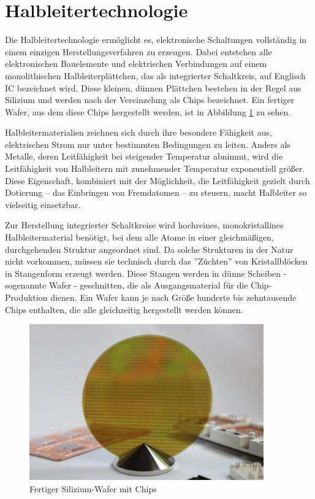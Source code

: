 \section{Halbleitertechnologie}

Die Halbleitertechnologie ermöglicht es, elektronische Schaltungen vollständig in einem einzigen Herstellungsverfahren zu erzeugen. Dabei entstehen alle elektronischen Bauelemente und elektrischen Verbindungen auf einem monolithischen Halbleiterplättchen, das als integrierter Schaltkreis, auf Englisch \gls{IC} bezeichnet wird. Diese kleinen, dünnen Plättchen bestehen in der Regel aus Silizium und werden nach der Vereinzelung als Chips bezeichnet. Ein fertiger Wafer, aus dem diese Chips hergestellt werden, ist in Abbildung \ref{fig:Silizium-Wafer} zu sehen.

Halbleitermaterialien zeichnen sich durch ihre besondere Fähigkeit aus, elektrischen Strom nur unter bestimmten Bedingungen zu leiten. Anders als Metalle, deren Leitfähigkeit bei steigender Temperatur abnimmt, wird die Leitfähigkeit von Halbleitern mit zunehmender Temperatur exponentiell größer. Diese Eigenschaft, kombiniert mit der Möglichkeit, die Leitfähigkeit gezielt durch Dotierung – das Einbringen von Fremd\-atomen – zu steuern, macht Halbleiter so vielseitig einsetzbar.

Zur Herstellung integrierter Schaltkreise wird hochreines, monokristallines Halbleitermaterial benötigt, bei dem alle Atome in einer gleichmäßigen, durchgehenden Struktur angeordnet sind. Da solche Strukturen in der Natur nicht vorkommen, müssen sie technisch durch das ''Züchten'' von Kristallblöcken in Stangenform erzeugt werden. Diese Stangen werden in dünne Scheiben - sogenannte Wafer - geschnitten, die als Ausgangsmaterial für die Chip-Produktion dienen. Ein Wafer kann je nach Größe hunderte bis zehntausende Chips enthalten, die alle gleichzeitig hergestellt werden können.

\begin{figure}[!h]
    \centering
    \includegraphics[width=0.9\textwidth]{bilder/SiC-Wafer-Infineon.jpg}
    \caption{Fertiger Silizium-Wafer mit Chips \cite{infineon2024dünnsterWafer}}
    \label{fig:Silizium-Wafer}
\end{figure}

